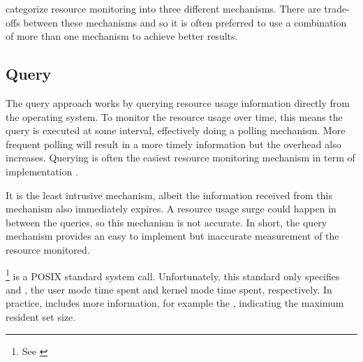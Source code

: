 \citet{juvePracticalResourceMonitoring2015} categorize resource monitoring into three different mechanisms.
There are trade-offs between these mechanisms and so it is often preferred to use a combination of more than one mechanism to achieve better results.

\subsection{Query}

The query approach works by querying resource usage information directly from the operating system.
To monitor the resource usage over time, this means the query is executed at some interval, effectively doing a polling mechanism.
More frequent polling will result in a more timely information but the overhead also increases.
Querying is often the easiest resource monitoring mechanism in term of implementation \citep{juvePracticalResourceMonitoring2015}.

It is the least intrusive mechanism, albeit the information received from this mechanism also immediately expires.
A resource usage surge could happen in between the queries, so this mechanism is not accurate.
In short, the query mechanism provides an easy to implement but inaccurate measurement of the resource monitored.

\footnote{See \href{https://linux.die.net/man/2/getrusage}{}} is a POSIX standard system call.
Unfortunately, this standard only specifies  and , the user mode time spent and kernel mode time spent, respectively.
In practice,  includes more information, for example the , indicating the maximum resident set size.

